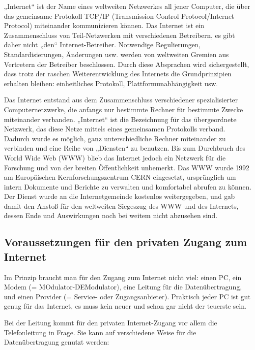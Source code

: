 \documentclass[]{book}
\theoremstyle{definition}
\theoremstyle{definition}
\theoremstyle{definition}
\theoremstyle{remark}
\begin{document}
„Internet`` ist der Name eines weltweiten Netzwerkes all jener Computer,
die über das gemeinsame Protokoll TCP/IP (Transmission Control
Protocol/Internet Protocol) miteinander kommunizieren können. Das
Internet ist ein Zusammenschluss von Teil-Netzwerken mit verschiedenen
Betreibern, es gibt daher nicht „den`` Internet-Betreiber. Notwendige
Regulierungen, Standardisierungen, Änderungen usw. werden von weltweiten
Gremien aus Vertretern der Betreiber beschlossen. Durch diese Absprachen
wird sichergestellt, dass trotz der raschen Weiterentwicklung des
Internets die Grundprinzipien erhalten bleiben: einheitliches Protokoll,
Plattformunabhängigkeit usw.

Das Internet entstand aus dem Zusammenschluss verschiedener
spezialisierter Computernetzwerke, die anfangs nur bestimmte Rechner für
bestimmte Zwecke miteinander verbanden. „Internet`` ist die Bezeichnung
für das übergeordnete Netzwerk, das diese Netze mittels eines
gemeinsamen Protokolls verband. Dadurch wurde es möglich, ganz
unterschiedliche Rechner miteinander zu verbinden und eine Reihe von
„Diensten`` zu benutzen. Bis zum Durchbruch des World Wide Web (WWW)
blieb das Internet jedoch ein Netzwerk für die Forschung und von der
breiten Öffentlichkeit unbemerkt. Das WWW wurde 1992 am Europäischen
Kernforschungszentrum CERN eingesetzt, ursprünglich um intern Dokumente
und Berichte zu verwalten und komfortabel abrufen zu können. Der Dienst
wurde an die Internetgemeinde kostenlos weitergegeben, und gab damit den
Anstoß für den weltweiten Siegeszug des WWW und des Internets, dessen
Ende und Auswirkungen noch bei weitem nicht abzusehen sind.

\subsection{Voraussetzungen für den privaten Zugang zum
Internet}\label{voraussetzungen-fur-den-privaten-zugang-zum-internet}

Im Prinzip braucht man für den Zugang zum Internet nicht viel: einen PC,
ein Modem (= MOdulator-DEModulator), eine Leitung für die
Datenübertragung, und einen Provider (= Service- oder Zugangsanbieter).
Praktisch jeder PC ist gut genug für das Internet, es muss kein neuer
und schon gar nicht der teuerste sein.

Bei der Leitung kommt für den privaten Internet-Zugang vor allem die
Telefonleitung in Frage. Sie kann auf verschiedene Weise für die
Datenübertragung genutzt werden:
\end{document}
